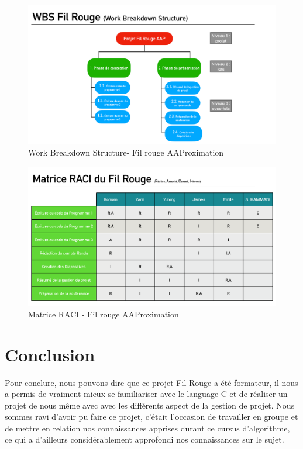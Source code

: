 \documentclass{article} %
\begin{document}
\begin{figure}[H]
  \begin{center}
    \includegraphics[scale=0.23]{Img_gdp/WBS.pdf}
  \end{center}
  \caption{Work Breakdown Structure- Fil rouge AAProximation}
  \label{fig:WBS}
\end{figure}


\begin{figure}[H]
  \begin{center}
    \includegraphics[scale=0.23]{Img_gdp/Matrice-RACI.pdf}
  \end{center}
  \caption{Matrice RACI - Fil rouge AAProximation}
  \label{fig:RACI}
\end{figure}




\section{Conclusion}

Pour conclure, nous pouvons dire que ce projet Fil Rouge a été formateur, il nous a permis de vraiment mieux se familiariser avec le language C et de réaliser un projet de nous même avec avec les différents aspect de la gestion de projet. Nous sommes ravi d’avoir pu faire ce projet, c’était l’occasion de travailler en groupe et de mettre en relation nos connaissances apprises durant ce cursus d'algorithme, ce qui a d’ailleurs considérablement approfondi nos connaissances sur le sujet. 
\end{document}
